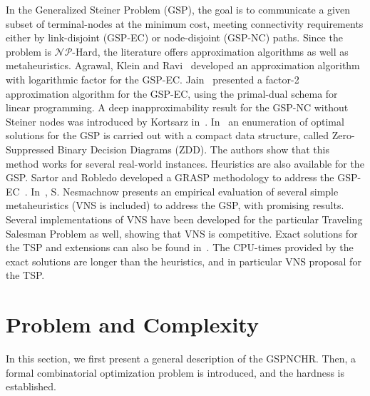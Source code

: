 \documentclass{llncs}
\begin{document}
In the Generalized Steiner Problem (GSP), the goal is to communicate a given subset of terminal-nodes at the minimum cost, 
meeting connectivity requirements either by link-disjoint (GSP-EC) or node-disjoint (GSP-NC) paths. 
Since the problem is $\mathcal{NP}$-Hard, the literature offers approximation algorithms as well as metaheuristics. 
Agrawal, Klein and Ravi~\cite{32} developed an approximation algorithm with logarithmic factor for the GSP-EC. 
Jain~\cite{33} presented a factor-2 approximation algorithm for the GSP-EC, 
using the primal-dual schema for linear programming. 
A deep inapproximability result for the GSP-NC without Steiner nodes was introduced by Kortsarz in~\cite{34}. 
In~\cite{99} an enumeration of optimal solutions for the GSP is carried out with a compact data structure, called 
Zero-Suppressed Binary Decision Diagrams (ZDD). The authors show that this method works for several real-world 
instances. Heuristics are also available for the GSP. Sartor and Robledo developed a GRASP methodology to address the 
GSP-EC~\cite{65}. In~\cite{67}, S. Nesmachnow presents an empirical evaluation of several simple metaheuristics (VNS is included) to address the GSP, with promising results. 
Several implementations of VNS have been developed for the particular Traveling Salesman Problem as well, showing that VNS is competitive. Exact solutions for the TSP and extensions can also be found in~\cite{61}. 
The CPU-times provided by the exact solutions are longer than the heuristics, and in particular VNS proposal for the TSP.

\section{Problem and Complexity}\label{problem}
In this section, we first present a general description of the GSPNCHR. Then, a formal combinatorial optimization problem is introduced, and the hardness is established.
\end{document}
